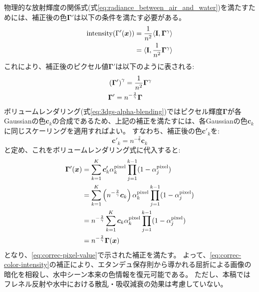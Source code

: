 物理的な放射輝度の関係式(式\ref{eq:radiance_between_air_and_water})を満たすためには、補正後の色$\bm{\Gamma}'$は以下の条件を満たす必要がある。
\begin{align}\label{eq:correc-color-intensity-condition}
  \mathrm{intensity}(\Gamma'(\bm{x})) &= \frac{1}{n^2}\langle\mathbf{I},\bm{\Gamma}^\gamma\rangle \notag \\
                                      &= \langle\mathbf{I}, \frac{1}{n^2} \bm{\Gamma}^\gamma\rangle  \notag \\
\end{align}
これにより、補正後のピクセル値$\bm{\Gamma}'$は以下のように表される:
\begin{align}\label{eq:correc-pixel-value}
  & \left(\bm{\Gamma}'\right)^\gamma = \frac{1}{n^2} \bm{\Gamma}^\gamma \notag \\
  & \bm{\Gamma}' = n^{-\frac{2}{\gamma}} \bm{\Gamma}
\end{align}
ボリュームレンダリング(式\ref{eq:3dgs-alpha-blending})ではピクセル輝度$\bm{\Gamma}$が各Gaussianの色$\bm{c}_k$の合成であるため、上記の補正を満たすには、各Gaussianの色$\bm{c}_k$に同じスケーリングを適用すればよい。
すなわち、補正後の色$\bm{c}'_k$を:
\begin{equation}\label{eq:correc-color-intensity}
  \bm{c}'_k = n^{-\frac{2}{\gamma}} \bm{c}_k
\end{equation}
と定め、これをボリュームレンダリング式に代入すると:
\begin{align}\label{eq:correc-color-intensity-rendering}
  \bm{\Gamma}'(\bm{x}) &= \sum_{k=1}^{K} \bm{c}'_k \alpha^{\text{pixel}}_k \prod_{j=1}^{k-1} (1-\alpha^{\text{pixel}}_j) \notag \\
  &= \sum_{k=1}^{K} \left(n^{-\frac{2}{\gamma}}\bm{c}_k\right) \alpha^{\text{pixel}}_k \prod_{j=1}^{k-1} (1-\alpha^{\text{pixel}}_j) \notag \\
  &= n^{-\frac{2}{\gamma}} \sum_{k=1}^{K} \bm{c}_k \alpha^{\text{pixel}}_k \prod_{j=1}^{k-1} (1-\alpha^{\text{pixel}}_j) \notag \\
  &= n^{-\frac{2}{\gamma}} \bm{\Gamma}(\bm{x})
\end{align}
となり、\cref{eq:correc-pixel-value}で示された補正を満たす。
よって、\cref{eq:correc-color-intensity}の補正により、エタンデュ保存則から導かれる屈折による画像の暗化を相殺し、水中シーン本来の色情報を復元可能である。
ただし、本稿ではフレネル反射や水中における散乱・吸収減衰の効果は考慮していない。
